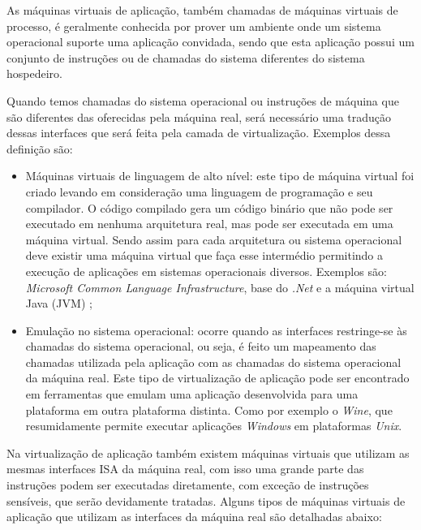 As máquinas virtuais de aplicação, também chamadas de máquinas virtuais de processo, é geralmente conhecida por prover um ambiente
onde um sistema operacional suporte uma aplicação convidada, sendo que esta aplicação possui um conjunto de instruções ou de chamadas
do sistema diferentes do sistema hospedeiro.

Quando temos chamadas do sistema operacional ou instruções de máquina que são diferentes das oferecidas pela máquina real, será necessário
uma tradução dessas interfaces que será feita pela camada de virtualização. Exemplos dessa definição são:

\begin{itemize}
 \item Máquinas virtuais de linguagem de alto nível: este tipo de máquina virtual foi criado levando em consideração uma linguagem de 
 programação e seu compilador. O código compilado gera um código binário que não pode ser executado em nenhuma arquitetura real, mas pode
 ser executada em uma máquina virtual. Sendo assim para cada arquitetura ou sistema operacional deve existir uma máquina virtual que faça
 esse intermédio permitindo a execução de aplicações em sistemas operacionais diversos. Exemplos são: \textit{Microsoft Common Language 
 Infrastructure}, base do \textit{.Net} e a máquina virtual Java (\ac{JVM}) \cite{carissimi2008};
 \item Emulação no sistema operacional: ocorre quando as interfaces restringe-se às chamadas do sistema operacional, ou seja,
 é feito um mapeamento das chamadas utilizada pela aplicação com as chamadas do sistema operacional da máquina real. Este tipo de 
 virtualização de aplicação pode ser encontrado em ferramentas que emulam uma aplicação desenvolvida para uma plataforma em outra
 plataforma distinta. Como por exemplo o \textit{Wine}, que resumidamente permite executar aplicações \textit{Windows} em plataformas
 \textit{Unix}.
\end{itemize}

Na virtualização de aplicação também existem máquinas virtuais que utilizam as mesmas interfaces \ac{ISA} da máquina real,
com isso uma grande parte das instruções podem ser executadas diretamente, com exceção de instruções sensíveis, que serão devidamente
tratadas. Alguns tipos de máquinas virtuais de aplicação que utilizam as interfaces da máquina real são detalhadas abaixo:

